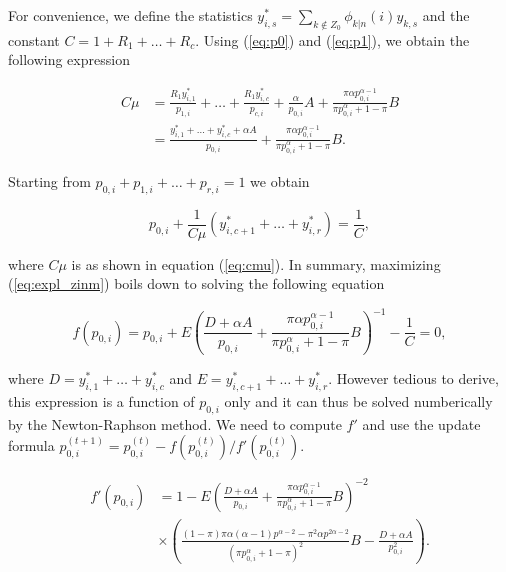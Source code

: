 \documentclass[12pt]{article}
\begin{document}
\begin{appendices}
    For convenience, we define the statistics
    $y_{i,s}^* = \sum_{k \notin Z_0} \phi_{k|n}(i) y_{k,s}$
    and the constant $C = 1 + R_1 + \ldots + R_c$.
    Using (\ref{eq:p0}) and (\ref{eq:p1}), we obtain the following
    expression

    \begin{align}
      C \mu &= \frac{R_1y_{i,1}^*}{p_{1,i}} +
        \ldots + \frac{R_1y_{i,c}^*}{p_{c,i}} + \frac{\alpha}{p_{0,i}}A
      + \frac{\pi\alpha p_{0,i}^{\alpha-1}} {\pi p_{0,i}^{\alpha} +
      1-\pi} B \nonumber \\
\label{eq:cmu}
      &= \frac{y_{i,1}^* + \ldots + y_{i,c}^*+\alpha A}{p_{0,i}}
      + \frac{\pi\alpha p_{0,i}^{\alpha-1}} {\pi p_{0,i}^{\alpha} +
      1-\pi} B.
    \end{align}

    Starting from $p_{0,i} + p_{1,i} + \ldots + p_{r,i} = 1$ we
    obtain

    \begin{equation*}
      p_{0,i} + \frac{1}{C\mu} (y_{i,c+1}^* + \ldots
      + y_{i,r}^*) = \frac{1}{C},
    \end{equation*}

    \noindent
    where $C\mu$ is as shown in equation (\ref{eq:cmu}). In summary,
    maximizing (\ref{eq:expl_zinm}) boils down to solving the
    following equation

    \begin{equation*}
      f(p_{0,i}) = p_{0,i} + E \left(\frac{D + \alpha A}
      {p_{0,i}} + \frac{\pi\alpha p_{0,i}^{\alpha-1}}
      {\pi p_{0,i}^{\alpha} + 1-\pi} B\right)^{-1} - \frac{1}{C} = 0,
    \end{equation*}

    \noindent
    where $D = y_{i,1}^* + \ldots + y_{i,c}^*$ and
    $E = y_{i,c+1}^* + \ldots + y_{i,r}^*$.
    However tedious to derive,
    this expression is a function of $p_{0,i}$ only and it can
    thus be solved numberically by the Newton-Raphson
    method. We need to compute $f'$ and use the update formula
    $p_{0,i}^{(t+1)} = p_{0,i}^{(t)} -
    f(p_{0,i}^{(t)})/f'(p_{0,i}^{(t)})$.


    \begin{align*}
      f'(p_{0,i}) &= 1 - E
      \left( \frac{D +\alpha A}{p_{0,i}}
      + \frac{\pi\alpha p_{0,i}^{\alpha-1}}
      {\pi p_{0,i}^{\alpha} + 1-\pi} B\right)^{-2} \\
      &\times \left( \frac{(1-\pi)\pi\alpha(\alpha-1)p^{\alpha-2}
        -\pi^2\alpha p^{2\alpha-2}}{(\pi p_{0,i}^{\alpha}+1-\pi)^2}B
      -\frac{D + \alpha A}{p_{0,i}^2}
       \right).
    \end{align*}


\end{appendices}
\end{document}
